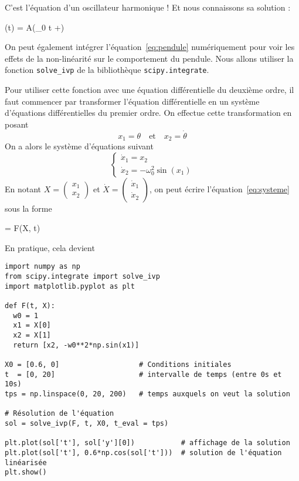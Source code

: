 \documentclass{cours}
\begin{document}
C'est l'équation d'un oscillateur harmonique ! Et nous connaissons sa solution : 
\begin{eqencadre}
\theta(t) = A\sin(\omega_0 t +\varphi)
\end{eqencadre}

On peut également intégrer l'équation~\ref{eq:pendule} numériquement pour voir les effets de la non-linéarité sur le comportement du pendule. Nous allons utiliser la fonction \texttt{solve\_ivp} de la bibliothèque \texttt{scipy.integrate}. 

Pour utiliser cette fonction avec une équation différentielle du deuxième ordre, il faut commencer par transformer l'équation différentielle en un système d'équations différentielles du premier ordre. On effectue cette transformation en posant 
\begin{equation}
  x_1 = \theta \quad \text{et} \quad  x_2 = \dot{\theta}
\end{equation}
On a alors le système d'équations suivant
\begin{equation}
  \begin{cases}
    \dot{x}_1 = x_2 \\
    \dot{x}_2 = -\omega_0^2\sin(x_1)
  \end{cases}
  \label{eq:systeme}
\end{equation}
En notant $X = \begin{pmatrix}x_1 \\ x_2\end{pmatrix}$ et $\dot{X} = \begin{pmatrix}\dot{x}_1\\\dot{x}_2\end{pmatrix}$, on peut écrire l'équation~\ref{eq:systeme} sous la forme
\begin{eqencadre}
   = F(X, t)
\end{eqencadre}

En pratique, cela devient
\begin{verbatim}
import numpy as np
from scipy.integrate import solve_ivp
import matplotlib.pyplot as plt

def F(t, X):
  w0 = 1
  x1 = X[0]
  x2 = X[1]
  return [x2, -w0**2*np.sin(x1)]
 
X0 = [0.6, 0]                   # Conditions initiales
t  = [0, 20]                    # intervalle de temps (entre 0s et 10s)
tps = np.linspace(0, 20, 200)   # temps auxquels on veut la solution

# Résolution de l'équation
sol = solve_ivp(F, t, X0, t_eval = tps)  

plt.plot(sol['t'], sol['y'][0])           # affichage de la solution
plt.plot(sol['t'], 0.6*np.cos(sol['t']))  # solution de l'équation linéarisée
plt.show()
\end{verbatim}
\end{document}
